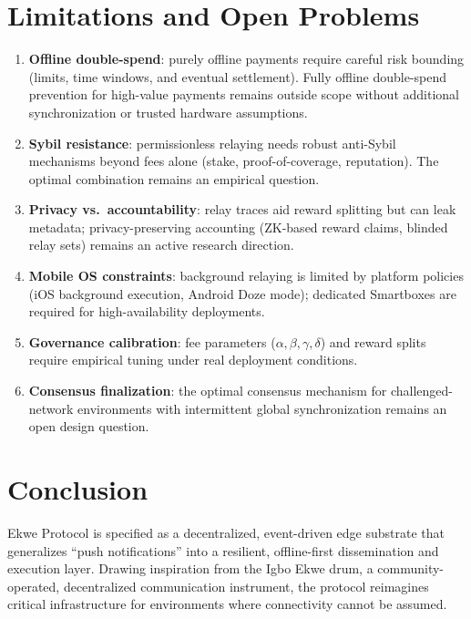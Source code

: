 \documentclass[11pt,a4paper]{article}
\begin{document}
\section{Limitations and Open Problems}

\begin{enumerate}[nosep]
  \item \textbf{Offline double-spend}: purely offline payments require careful risk bounding (limits, time windows, and eventual settlement). Fully offline double-spend prevention for high-value payments remains outside scope without additional synchronization or trusted hardware assumptions.
  \item \textbf{Sybil resistance}: permissionless relaying needs robust anti-Sybil mechanisms beyond fees alone (stake, proof-of-coverage, reputation). The optimal combination remains an empirical question.
  \item \textbf{Privacy vs.\ accountability}: relay traces aid reward splitting but can leak metadata; privacy-preserving accounting (ZK-based reward claims, blinded relay sets) remains an active research direction.
  \item \textbf{Mobile OS constraints}: background relaying is limited by platform policies (iOS background execution, Android Doze mode); dedicated Smartboxes are required for high-availability deployments.
  \item \textbf{Governance calibration}: fee parameters ($\alpha, \beta, \gamma, \delta$) and reward splits require empirical tuning under real deployment conditions.
  \item \textbf{Consensus finalization}: the optimal consensus mechanism for challenged-network environments with intermittent global synchronization remains an open design question.
\end{enumerate}

\section{Conclusion}

Ekwe Protocol is specified as a decentralized, event-driven edge substrate that generalizes ``push notifications'' into a resilient, offline-first dissemination and execution layer. Drawing inspiration from the Igbo Ekwe drum, a community-operated, decentralized communication instrument, the protocol reimagines critical infrastructure for environments where connectivity cannot be assumed.
\end{document}
